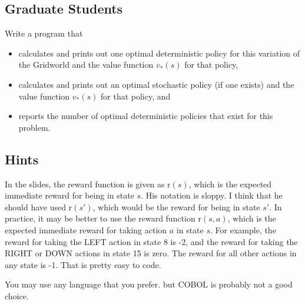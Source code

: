 \documentclass{article}
\begin{document}
\subsection*{Graduate Students}
Write a program that
\begin{itemize}
\item calculates and prints out one optimal deterministic policy for this variation of the Gridworld and the value function $v_*(s)$ for that policy,
\item calculates and prints out an optimal stochastic policy (if one exists) and the value function $v_*(s)$ for that policy, and
  \item reports the number of optimal deterministic policies that exist for this problem.
\end{itemize}
\subsection*{Hints}

In the slides, the reward function is given as $\textrm{r}(s)$, which is the expected immediate reward for being  in state $s$. His notation is sloppy.  I think that he should have used  $\textrm{r}(s')$, which would be the reward for being in state $s'$. In practice, it may be better to use the reward function $\textrm{r}(s,a)$, which is the expected immediate reward for taking action $a$ in state $s$.  For example, the reward for taking the LEFT action in state 8 is -2, and the reward for taking the RIGHT or DOWN actions in state 15 is zero.  The reward for all other actions in any state is -1. That is pretty easy to code.

You may use any language that you prefer. but COBOL is probably not a good choice.
\end{document}

